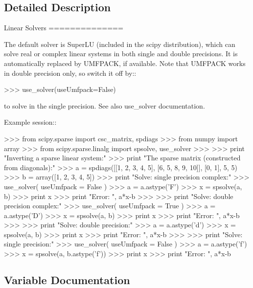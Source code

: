 \subsection{Detailed Description}
\begin{DoxyVerb}Linear Solvers
==============

The default solver is SuperLU (included in the scipy distribution),
which can solve real or complex linear systems in both single and
double precisions.  It is automatically replaced by UMFPACK, if
available.  Note that UMFPACK works in double precision only, so
switch it off by::

    >>> use_solver(useUmfpack=False)

to solve in the single precision. See also use_solver documentation.

Example session::

    >>> from scipy.sparse import csc_matrix, spdiags
    >>> from numpy import array
    >>> from scipy.sparse.linalg import spsolve, use_solver
    >>>
    >>> print "Inverting a sparse linear system:"
    >>> print "The sparse matrix (constructed from diagonals):"
    >>> a = spdiags([[1, 2, 3, 4, 5], [6, 5, 8, 9, 10]], [0, 1], 5, 5)
    >>> b = array([1, 2, 3, 4, 5])
    >>> print "Solve: single precision complex:"
    >>> use_solver( useUmfpack = False )
    >>> a = a.astype('F')
    >>> x = spsolve(a, b)
    >>> print x
    >>> print "Error: ", a*x-b
    >>>
    >>> print "Solve: double precision complex:"
    >>> use_solver( useUmfpack = True )
    >>> a = a.astype('D')
    >>> x = spsolve(a, b)
    >>> print x
    >>> print "Error: ", a*x-b
    >>>
    >>> print "Solve: double precision:"
    >>> a = a.astype('d')
    >>> x = spsolve(a, b)
    >>> print x
    >>> print "Error: ", a*x-b
    >>>
    >>> print "Solve: single precision:"
    >>> use_solver( useUmfpack = False )
    >>> a = a.astype('f')
    >>> x = spsolve(a, b.astype('f'))
    >>> print x
    >>> print "Error: ", a*x-b\end{DoxyVerb}
 

\subsection{Variable Documentation}
\hypertarget{namespacescipy_1_1sparse_1_1linalg_1_1dsolve_ac7dd37dd0830e4f58008ecb5f4eac711}{}
